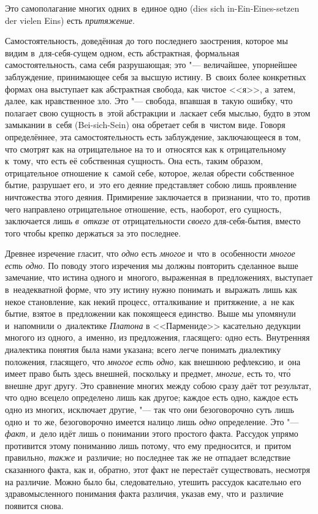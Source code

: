 Это самополагание многих одних в~единое одно (dies sich
in-Ein-Eines-setzen der vielen Eins) есть {\em притяжение}.


Самостоятельность, доведённая до того последнего заострения, которое мы
видим в~для-себя-сущем одном, есть абстрактная, формальная
самостоятельность, сама себя разрушающая; это "--- величайшее, упорнейшее
заблуждение, принимающее себя за высшую истину. В~своих более конкретных
формах она выступает как абстрактная свобода, как чистое <<я>>, а~затем,
далее, как нравственное зло. Это "--- свобода, впавшая в~такую ошибку, что
полагает свою сущность в~этой абстракции и~ласкает себя мыслью, будто в
этом замыкании в~себя (Bei-sich-Sein) она обретает себя в~чистом виде.
Говоря определённее, эта самостоятельность есть заблуждение, заключающееся
в том, что смотрят как на отрицательное на то и~относятся как к
отрицательному к~тому, что есть её собственная сущность. Она есть, таким
образом, отрицательное отношение к~самой себе, которое, желая обрести
собственное бытие, разрушает его, и~это его деяние представляет собою лишь
проявление ничтожества этого деяния. Примирение заключается в~признании,
что то, против чего направлено отрицательное отношение, есть, наоборот, его
сущность, заключается лишь {\em в~отказе} от
отрицательности {\em своего} для-себя-бытия, вместо
того чтобы крепко держаться за это последнее.

Древнее изречение гласит, что {\em одно} есть
{\em многое} и~что в~особенности
{\em многое есть одно}. По поводу этого изречения мы
должны повторить сделанное выше замечание, что истина одного и~многого,
выраженная в~предложениях, выступает в~неадекватной форме, что эту истину
нужно понимать и~выражать лишь как некое становление, как некий процесс,
отталкивание и~притяжение, а~не как бытие, взятое в~предложении как
покоящееся единство. Выше мы упомянули и~напомнили о~диалектике
{\em Платона} в <<Пармениде>> касательно дедукции многого
из одного, а~именно, из предложения, гласящего: одно есть. Внутренняя
диалектика понятия была нами указана; всего легче понимать диалектику
положения, гласящего, что {\em многое есть одно,} как
внешнюю рефлексию, и~она имеет право быть здесь внешней, поскольку и
предмет, {\em многие,} есть то, чт\'{о} внешне друг другу.
Это сравнение многих между собою сразу даёт тот результат, что одно всецело
определено лишь как другое; каждое есть одно, каждое есть одно из многих,
исключает другие, "--- так что они безоговорочно суть лишь одно и~то же,
безоговорочно имеется налицо лишь {\em одно}
определение. Это "--- {\em факт,} и~дело идёт лишь о
понимании этого простого факта. Рассудок упрямо противится этому пониманию
лишь потому, что ему предносится, и~притом правильно,
{\em также} и~различие; но последнее так же не отпадает
вследствие сказанного факта, как и, обратно, этот факт не перестаёт
существовать, несмотря на различие. Можно было бы, следовательно, утешить
рассудок касательно его здравомысленного понимания факта различия, указав
ему, что и~различие появится снова.

